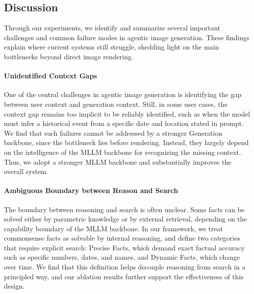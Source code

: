\documentclass{llmxive}
\begin{document}
\subsection{Discussion}
Through our experiments, we identify and summarize several important challenges and common failure modes in agentic image generation. These findings explain where current systems still struggle, shedding light on the main bottlenecks beyond direct image rendering.

\paragraph{Unidentified Context Gaps}
One of the central challenges in agentic image generation is identifying the gap between user context and generation context. Still, in some user cases, the context gap remains too implicit to be reliably identified, such as when the model must infer a historical event from a specific date and location stated in prompt. We find that such failures cannot be addressed by a stronger Generation backbone, since the bottleneck lies before rendering. Instead, they largely depend on the intelligence of the MLLM backbone for recognizing the missing context. Thus, we adopt a stronger MLLM backbone and substantially improves the overall system.

\paragraph{Ambiguous Boundary between Reason and Search}
The boundary between reasoning and search is often unclear. Some facts can be solved either by parametric knowledge or by external retrieval, depending on the capability boundary of the MLLM backbone. In our framework, we treat commonsense facts as solvable by internal reasoning, and define two categories that require explicit search: Precise Facts, which demand exact factual accuracy such as specific numbers, dates, and names, and Dynamic Facts, which change over time. We find that this definition helps decouple reasoning from search in a principled way, and our ablation results further support the effectiveness of this design.
\end{document}
